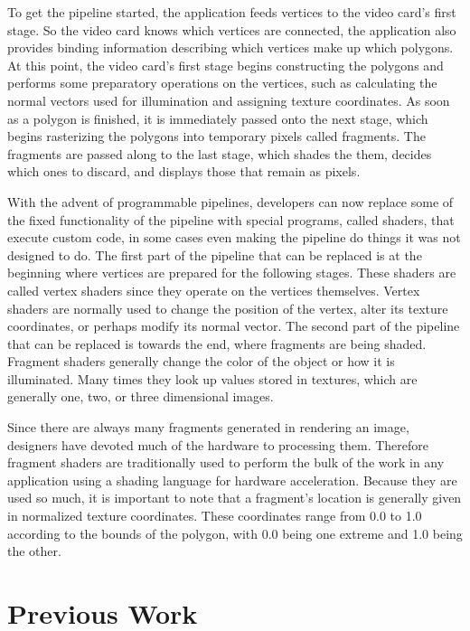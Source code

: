 \documentclass{article}
\begin{document}
To get the pipeline started, the application feeds vertices to the video card’s
first stage.  So the video card knows which vertices are connected, the
application also provides binding information describing which vertices make up
which polygons.  At this point, the video card’s first stage begins constructing
the polygons and performs some preparatory operations on the vertices, such as
calculating the normal vectors used for illumination and assigning texture
coordinates.  As soon as a polygon is finished, it is immediately passed onto
the next stage, which begins rasterizing the polygons into temporary pixels
called fragments.  The fragments are passed along to the last stage, which
shades the them, decides which ones to discard, and displays those that remain
as pixels.

With the advent of programmable pipelines, developers can now replace some of
the fixed functionality of the pipeline with special programs, called shaders,
that execute custom code, in some cases even making the pipeline do things it
was not designed to do.  The first part of the pipeline that can be replaced is
at the beginning where vertices are prepared for the following stages.  These
shaders are called vertex shaders since they operate on the vertices themselves.
Vertex shaders are normally used to change the position of the vertex, alter its
texture coordinates, or perhaps modify its normal vector.  The second part of
the pipeline that can be replaced is towards the end, where fragments are being
shaded.  Fragment shaders generally change the color of the object or how it is
illuminated.  Many times they look up values stored in textures, which are
generally one, two, or three dimensional images.

Since there are always many fragments generated in rendering an image, designers
have devoted much of the hardware to processing them.  Therefore fragment
shaders are traditionally used to perform the bulk of the work in any
application using a shading language for hardware acceleration.  Because they
are used so much, it is important to note that a fragment’s location is
generally given in normalized texture coordinates.  These coordinates range from
0.0 to 1.0 according to the bounds of the polygon, with 0.0 being one extreme
and 1.0 being the other.

\section{Previous Work}
\end{document}
